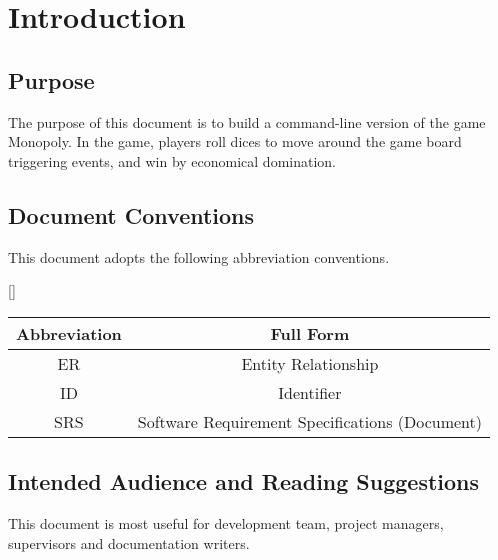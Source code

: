 \chapter{Introduction}
\label{ch:intro}

\section{Purpose}

The purpose of this document is to build a command-line version of the game Monopoly. In the game, players roll dices to move around the game board triggering events, and win by economical domination. \par

\section{Document Conventions}

This document adopts the following abbreviation conventions. \par

\begin{center}[]
\begin{tabular}{ c|c }
Abbreviation & Full Form \\
[0.5ex] \hline\hline
ER & Entity Relationship \\
ID & Identifier \\
SRS & Software Requirement Specifications (Document) \\
\end{tabular}
\end{center}


\section{Intended Audience and Reading Suggestions}

This document is most useful for development team, project managers, supervisors and documentation writers. \par

